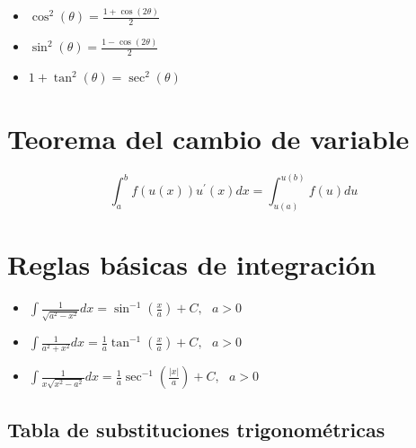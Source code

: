 \documentclass[twoside,landscape,letterpaper,twocolumn,13pt]{book}
\begin{document}
\begin{itemize}
    \item $\displaystyle{\cos^{2}(\theta) = \frac{1+ \cos(2\theta)}{2}}$

    \item $\displaystyle{\sin^{2}(\theta) = \frac{1- \cos(2\theta)}{2}}$

    \item $1 + \tan^{2}(\theta) = \sec^{2}(\theta)$
    
\end{itemize}

\section*{Teorema del cambio de variable}

\begin{equation}
    \displaystyle{\int_{a}^{b} f(u(x))u^{'}(x) dx = \int_{u(a)}^{u(b)} f(u)du  }
\end{equation}


\section*{Reglas básicas de integración}

\begin{itemize}
    \item $\displaystyle{\int \frac{1}{\sqrt{a^{2} - x^{2}}} dx } = \sin^{-1}\left(\frac{x}{a}\right) + C, \, \, \, \, a >0$

    \item $\displaystyle{\int \frac{1}{a^{2} + x^{2}} dx } = \frac{1}{a} \tan^{-1}\left(\frac{x}{a}\right) + C, \,  \, \, \, a >0$

     \item $\displaystyle{\int \frac{1}{x\sqrt{x^{2} - a^{2}}}dx} = \frac{1}{a} \sec^{-1}\left(\frac{|x|}{a}\right) + C, \,  \, \, \, a >0$
     
\end{itemize}

\subsection*{Tabla de substituciones trigonométricas}
\end{document}
